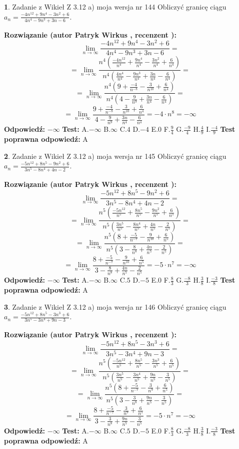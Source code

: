 \documentclass[12pt, a4paper]{article}
\theoremstyle{definition} %
\newtheorem{zad}{}
\newcommand{\zadStart}[1]{\begin{zad}#1\newline}
\newcommand{\zadStop}{\end{zad}}
\newcommand{\rozwStart}[2]{\noindent \textbf{Rozwiązanie (autor #1 , recenzent #2): }\newline}
\newcommand{\rozwStop}{\newline}
\newcommand{\odpStart}{\noindent \textbf{Odpowiedź:}\newline}
\newcommand{\odpStop}{\newline}
\newcommand{\testStart}{\noindent \textbf{Test:}\newline}
\newcommand{\testStop}{\newline}
\newcommand{\kluczStart}{\noindent \textbf{Test poprawna odpowiedź:}\newline}
\newcommand{\kluczStop}{\newline}
\begin{document}
\zadStart{Zadanie z Wikieł Z 3.12 a) moja wersja nr 144}
Obliczyć granicę ciągu $a_{n}=\frac{-4n^{12}+9n^{4}-3n^{2}+6}{4n^{4}-9n^{3}+3n-6}$.
\zadStop
\rozwStart{Patryk Wirkus}{}
$$\lim\limits_{n\to\infty}\frac{-4n^{12}+9n^{4}-3n^{2}+6}{4n^{4}-9n^{3}+3n-6}=$$
$$=\lim\limits_{n\to\infty}\frac{n^{4}\left(\frac{-4n^{12}}{n^{4}}+\frac{9n^{4}}{n^{4}}-\frac{3n^{2}}{n^{4}}+\frac{6}{n^{4}}\right)}{n^{4}\left(\frac{4n^{4}}{n^{4}}-\frac{9n^{3}}{n^{4}}+\frac{3n}{n^{4}}-\frac{6}{n^{4}}\right)}=$$
$$=\lim\limits_{n\to\infty}\frac{n^{4}\left(9+\frac{-4}{n^{-8}}-\frac{3}{n^{10}}+\frac{6}{n^{4}}\right)}
{n^{4}\left(4-\frac{9}{n^{9}}+\frac{3n}{n^{4}}-\frac{6}{n^{4}}\right)}=$$
$$=\lim\limits_{n\to\infty}\frac{9+\frac{-4}{n^{-8}}-\frac{3}{n^{10}}+\frac{6}{n^{4}}}{4-\frac{9}{n^{9}}+\frac{3n}{n^{4}}-\frac{6}{n^{4}}}=-4\cdot n^{8} = -\infty$$
\rozwStop
\odpStart
$-\infty$
\odpStop
\testStart
A.$-\infty$
B.$\infty$
C.$4$
D.$-4$
E.$0$
F.$\frac{9}{4}$
G.$\frac{-9}{4}$
H.$\frac{4}{9}$
I.$\frac{-4}{9}$
\testStop
\kluczStart
A
\kluczStop



\zadStart{Zadanie z Wikieł Z 3.12 a) moja wersja nr 145}
Obliczyć granicę ciągu $a_{n}=\frac{-5n^{12}+8n^{5}-9n^{2}+6}{3n^{5}-8n^{4}+4n-2}$.
\zadStop
\rozwStart{Patryk Wirkus}{}
$$\lim\limits_{n\to\infty}\frac{-5n^{12}+8n^{5}-9n^{2}+6}{3n^{5}-8n^{4}+4n-2}=$$
$$=\lim\limits_{n\to\infty}\frac{n^{5}\left(\frac{-5n^{12}}{n^{5}}+\frac{8n^{5}}{n^{5}}-\frac{9n^{2}}{n^{5}}+\frac{6}{n^{5}}\right)}{n^{5}\left(\frac{3n^{5}}{n^{5}}-\frac{8n^{4}}{n^{5}}+\frac{4n}{n^{5}}-\frac{2}{n^{5}}\right)}=$$
$$=\lim\limits_{n\to\infty}\frac{n^{5}\left(8+\frac{-5}{n^{-7}}-\frac{9}{n^{10}}+\frac{6}{n^{5}}\right)}
{n^{5}\left(3-\frac{8}{n^{8}}+\frac{4n}{n^{5}}-\frac{2}{n^{5}}\right)}=$$
$$=\lim\limits_{n\to\infty}\frac{8+\frac{-5}{n^{-7}}-\frac{9}{n^{10}}+\frac{6}{n^{5}}}{3-\frac{8}{n^{8}}+\frac{4n}{n^{5}}-\frac{2}{n^{5}}}=-5\cdot n^{7} = -\infty$$
\rozwStop
\odpStart
$-\infty$
\odpStop
\testStart
A.$-\infty$
B.$\infty$
C.$5$
D.$-5$
E.$0$
F.$\frac{8}{3}$
G.$\frac{-8}{3}$
H.$\frac{3}{8}$
I.$\frac{-3}{8}$
\testStop
\kluczStart
A
\kluczStop



\zadStart{Zadanie z Wikieł Z 3.12 a) moja wersja nr 146}
Obliczyć granicę ciągu $a_{n}=\frac{-5n^{12}+8n^{5}-3n^{3}+6}{3n^{5}-3n^{4}+9n-3}$.
\zadStop
\rozwStart{Patryk Wirkus}{}
$$\lim\limits_{n\to\infty}\frac{-5n^{12}+8n^{5}-3n^{3}+6}{3n^{5}-3n^{4}+9n-3}=$$
$$=\lim\limits_{n\to\infty}\frac{n^{5}\left(\frac{-5n^{12}}{n^{5}}+\frac{8n^{5}}{n^{5}}-\frac{3n^{3}}{n^{5}}+\frac{6}{n^{5}}\right)}{n^{5}\left(\frac{3n^{5}}{n^{5}}-\frac{3n^{4}}{n^{5}}+\frac{9n}{n^{5}}-\frac{3}{n^{5}}\right)}=$$
$$=\lim\limits_{n\to\infty}\frac{n^{5}\left(8+\frac{-5}{n^{-7}}-\frac{3}{n^{9}}+\frac{6}{n^{5}}\right)}
{n^{5}\left(3-\frac{3}{n^{8}}+\frac{9n}{n^{5}}-\frac{3}{n^{5}}\right)}=$$
$$=\lim\limits_{n\to\infty}\frac{8+\frac{-5}{n^{-7}}-\frac{3}{n^{9}}+\frac{6}{n^{5}}}{3-\frac{3}{n^{8}}+\frac{9n}{n^{5}}-\frac{3}{n^{5}}}=-5\cdot n^{7} = -\infty$$
\rozwStop
\odpStart
$-\infty$
\odpStop
\testStart
A.$-\infty$
B.$\infty$
C.$5$
D.$-5$
E.$0$
F.$\frac{8}{3}$
G.$\frac{-8}{3}$
H.$\frac{3}{8}$
I.$\frac{-3}{8}$
\testStop
\kluczStart
A
\kluczStop
\end{document}
